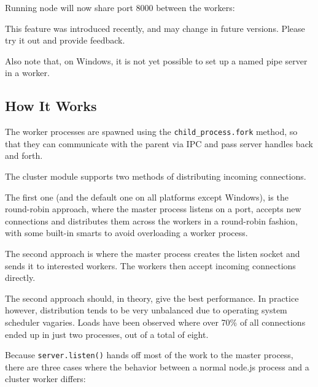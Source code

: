 Running node will now share port 8000 between the workers:

\begin{Shaded}
\end{Shaded}

This feature was introduced recently, and may change in future versions.
Please try it out and provide feedback.

Also note that, on Windows, it is not yet possible to set up a named
pipe server in a worker.

\subsection{How It Works}

The worker processes are spawned using the \texttt{child\_process.fork}
method, so that they can communicate with the parent via IPC and pass
server handles back and forth.

The cluster module supports two methods of distributing incoming
connections.

The first one (and the default one on all platforms except Windows), is
the round-robin approach, where the master process listens on a port,
accepts new connections and distributes them across the workers in a
round-robin fashion, with some built-in smarts to avoid overloading a
worker process.

The second approach is where the master process creates the listen
socket and sends it to interested workers. The workers then accept
incoming connections directly.

The second approach should, in theory, give the best performance. In
practice however, distribution tends to be very unbalanced due to
operating system scheduler vagaries. Loads have been observed where over
70\% of all connections ended up in just two processes, out of a total
of eight.

Because \texttt{server.listen()} hands off most of the work to the
master process, there are three cases where the behavior between a
normal node.js process and a cluster worker differs:

